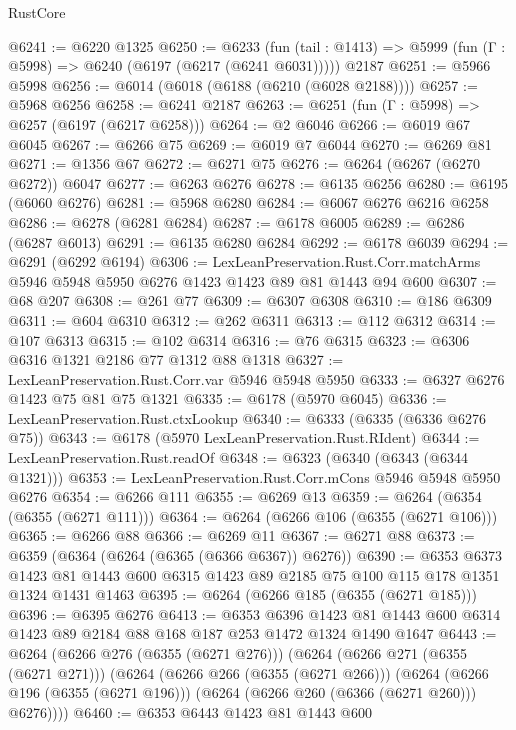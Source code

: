 \begin{lexlean}{RustCore}
\begin{coremodule}
@6241 := @6220 @1325
@6250 := @6233
    (fun (tail : @1413) => @5999 (fun (Γ : @5998) => @6240 (@6197 (@6217 (@6241 @6031)))))
    @2187
@6251 := @5966 @5998
@6256 := @6014 (@6018 (@6188 (@6210 (@6028 @2188))))
@6257 := @5968 @6256
@6258 := @6241 @2187
@6263 := @6251 (fun (Γ : @5998) => @6257 (@6197 (@6217 @6258)))
@6264 := @2 @6046
@6266 := @6019 @67 @6045
@6267 := @6266 @75
@6269 := @6019 @7 @6044
@6270 := @6269 @81
@6271 := @1356 @67
@6272 := @6271 @75
@6276 := @6264 (@6267 (@6270 @6272)) @6047
@6277 := @6263 @6276
@6278 := @6135 @6256
@6280 := @6195 (@6060 @6276)
@6281 := @5968 @6280
@6284 := @6067 @6276 @6216 @6258
@6286 := @6278 (@6281 @6284)
@6287 := @6178 @6005
@6289 := @6286 (@6287 @6013)
@6291 := @6135 @6280 @6284
@6292 := @6178 @6039
@6294 := @6291 (@6292 @6194)
@6306 := LexLeanPreservation.Rust.Corr.matchArms
    @5946
    @5948
    @5950
    @6276
    @1423
    @1423
    @89
    @81
    @1443
    @94
    @600
@6307 := @68 @207
@6308 := @261 @77
@6309 := @6307 @6308
@6310 := @186 @6309
@6311 := @604 @6310
@6312 := @262 @6311
@6313 := @112 @6312
@6314 := @107 @6313
@6315 := @102 @6314
@6316 := @76 @6315
@6323 := @6306 @6316 @1321 @2186 @77 @1312 @88 @1318
@6327 := LexLeanPreservation.Rust.Corr.var @5946 @5948 @5950
@6333 := @6327 @6276 @1423 @75 @81 @75 @1321
@6335 := @6178 (@5970 @6045)
@6336 := LexLeanPreservation.Rust.ctxLookup
@6340 := @6333 (@6335 (@6336 @6276 @75))
@6343 := @6178 (@5970 LexLeanPreservation.Rust.RIdent)
@6344 := LexLeanPreservation.Rust.readOf
@6348 := @6323 (@6340 (@6343 (@6344 @1321)))
@6353 := LexLeanPreservation.Rust.Corr.mCons @5946 @5948 @5950 @6276
@6354 := @6266 @111
@6355 := @6269 @13
@6359 := @6264 (@6354 (@6355 (@6271 @111)))
@6364 := @6264 (@6266 @106 (@6355 (@6271 @106)))
@6365 := @6266 @88
@6366 := @6269 @11
@6367 := @6271 @88
@6373 := @6359 (@6364 (@6264 (@6365 (@6366 @6367)) @6276))
@6390 := @6353
    @6373
    @1423
    @81
    @1443
    @600
    @6315
    @1423
    @89
    @2185
    @75
    @100
    @115
    @178
    @1351
    @1324
    @1431
    @1463
@6395 := @6264 (@6266 @185 (@6355 (@6271 @185)))
@6396 := @6395 @6276
@6413 := @6353
    @6396
    @1423
    @81
    @1443
    @600
    @6314
    @1423
    @89
    @2184
    @88
    @168
    @187
    @253
    @1472
    @1324
    @1490
    @1647
@6443 := @6264
    (@6266 @276 (@6355 (@6271 @276)))
    (@6264
      (@6266 @271 (@6355 (@6271 @271)))
      (@6264
        (@6266 @266 (@6355 (@6271 @266)))
        (@6264 (@6266 @196 (@6355 (@6271 @196))) (@6264 (@6266 @260 (@6366 (@6271 @260))) @6276))))
@6460 := @6353
    @6443
    @1423
    @81
    @1443
    @600

\end{coremodule}
\end{lexlean}

